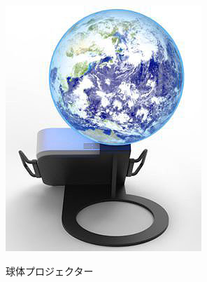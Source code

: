 \begin{figure}[tbp]
  \centering
  \includegraphics[scale=1.4]{fig/Glomal350.jpg}
  \caption{球体プロジェクター}\cite{15}
\end{figure}

